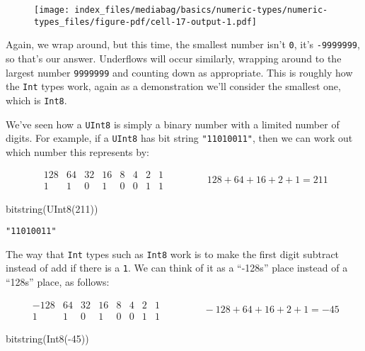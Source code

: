 \documentclass[
  letterpaper,
  DIV=11,
  numbers=noendperiod]{scrreprt}
\newenvironment{Shaded}{\begin{snugshade}}{\end{snugshade}}
\newcommand{\FloatTok}[1]{\textcolor[rgb]{0.68,0.00,0.00}{#1}}
\newcommand{\FunctionTok}[1]{\textcolor[rgb]{0.28,0.35,0.67}{#1}}
\newcommand{\NormalTok}[1]{\textcolor[rgb]{0.00,0.23,0.31}{#1}}
\newcommand{\OperatorTok}[1]{\textcolor[rgb]{0.37,0.37,0.37}{#1}}
\begin{document}
\begin{figure}[H]

{\centering \texttt{[image: index\_files/mediabag/basics/numeric-types/numeric-types\_files/figure-pdf/cell-17-output-1.pdf]}

}

\end{figure}

Again, we wrap around, but this time, the smallest number isn't
\texttt{0}, it's \texttt{-9999999}, so that's our answer. Underflows
will occur similarly, wrapping around to the largest number
\texttt{9999999} and counting down as appropriate. This is roughly how
the \texttt{Int} types work, again as a demonstration we'll consider the
smallest one, which is \texttt{Int8}.

We've seen how a \texttt{UInt8} is simply a binary number with a limited
number of digits. For example, if a \texttt{UInt8} has bit string
\texttt{"11010011"}, then we can work out which number this represents
by:

\[
\begin{matrix}
128 & 64 & 32 & 16 & 8 & 4 & 2 & 1 \\\hline
1 & 1 & 0 & 1 & 0 & 0 & 1 & 1
\end{matrix} \qquad \qquad 128 + 64 + 16 + 2 + 1 = 211
\]

\begin{Shaded}
\begin{Highlighting}[]
\FunctionTok{bitstring}\NormalTok{(}\FunctionTok{UInt8}\NormalTok{(}\FloatTok{211}\NormalTok{))}
\end{Highlighting}
\end{Shaded}

\begin{verbatim}
"11010011"
\end{verbatim}

The way that \texttt{Int} types such as \texttt{Int8} work is to make
the first digit subtract instead of add if there is a \texttt{1}. We can
think of it as a ``-128s'' place instead of a ``128s'' place, as
follows:

\[
\begin{matrix}
-128 & 64 & 32 & 16 & 8 & 4 & 2 & 1 \\\hline
1 & 1 & 0 & 1 & 0 & 0 & 1 & 1
\end{matrix} \qquad \qquad -128 + 64 + 16 + 2 + 1 = -45
\]

\begin{Shaded}
\begin{Highlighting}[]
\FunctionTok{bitstring}\NormalTok{(}\FunctionTok{Int8}\NormalTok{(}\OperatorTok{{-}}\FloatTok{45}\NormalTok{))}
\end{Highlighting}
\end{Shaded}
\end{document}
